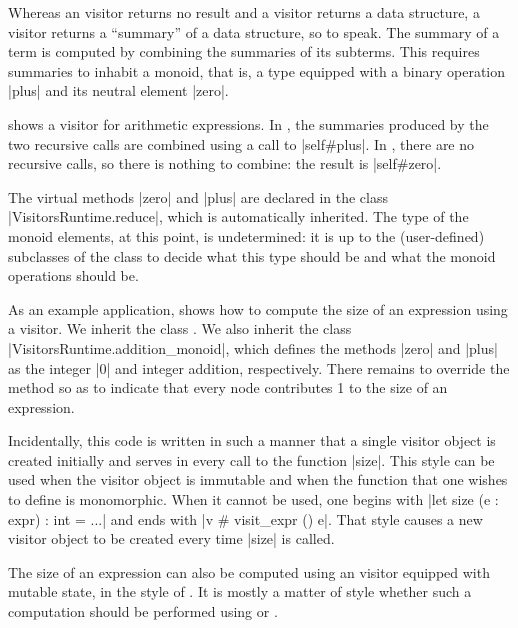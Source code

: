 \documentclass[11pt,a4paper,twoside]{article}
\begin{document}
Whereas an \iter visitor returns no result and a \map visitor returns a data
structure, a \reduce visitor returns a ``summary'' of a data structure, so to
speak. The summary of a term is computed by combining the summaries of its
subterms. This requires summaries to inhabit a monoid, that is, a type
equipped with a binary operation \oc|plus| and its neutral element \oc|zero|.

 shows a \reduce visitor for arithmetic expressions. In
, the summaries produced by the two recursive calls are
combined using a call to \oc|self#plus|. In , there are
no recursive calls, so there is nothing to combine: the result is
\oc|self#zero|.

The virtual methods \oc|zero| and \oc|plus| are declared in the class
\oc|VisitorsRuntime.reduce|, which is automatically inherited. The type of the
monoid elements, at this point, is undetermined: it is up to the
(user-defined) subclasses of the class \reduce to decide what this type should
be and what the monoid operations should be.

As an example application,  shows how to compute the size of
an expression using a \reduce visitor. We inherit the class \reduce. We also
inherit the class \oc|VisitorsRuntime.addition_monoid|, which defines the
methods \oc|zero| and \oc|plus| as the integer \oc|0| and integer addition,
respectively. There remains to override the method  so as
to indicate that every node contributes 1 to the size of an expression.

Incidentally, this code is written in such a manner that a single visitor
object is created initially and serves in every call to the function
\oc|size|. This style can be used when the visitor object is immutable and
when the function that one wishes to define is monomorphic. When it cannot be
used, one begins with \oc|let size (e : expr) : int = ...| and ends with %
\oc|v # visit_expr () e|. That style causes a new visitor object to be created
every time \oc|size| is called.

The size of an expression can also be computed using an \iter visitor equipped
with mutable state, in the style of . It is mostly a matter
of style whether such a computation should be performed using \iter or
\reduce.
\end{document}
